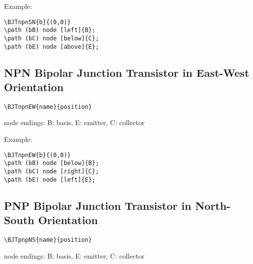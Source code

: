 \documentclass[parskip=full]{scrartcl}
\begin{document}
Example:\\
\begin{minipage}{0.8\textwidth}
\begin{verbatim}
\BJTnpnSN{b}{(0,0)}
\path (bB) node [left]{B};
\path (bC) node [below]{C};
\path (bE) node [above]{E};
\end{verbatim}
\end{minipage}
\begin{minipage}{0.19\textwidth}
\end{minipage}

\subsection{NPN Bipolar Junction Transistor in East-West Orientation}

\begin{verbatim}
\BJTnpnEW{name}{position}
\end{verbatim}
node endings: B: basis, E: emitter, C: collector

Example:\\
\begin{minipage}{0.8\textwidth}
\begin{verbatim}
\BJTnpnEW{b}{(0,0)}
\path (bB) node [below]{B};
\path (bC) node [right]{C};
\path (bE) node [left]{E};
\end{verbatim}
\end{minipage}
\begin{minipage}{0.19\textwidth}
\end{minipage}

\subsection{PNP Bipolar Junction Transistor in North-South Orientation}

\begin{verbatim}
\BJTpnpNS{name}{position}
\end{verbatim}
node endings: B: basis, E: emitter, C: collector
\end{document}
